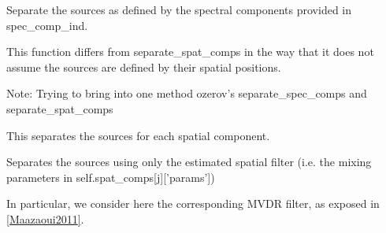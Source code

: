 \documentclass[letterpaper,10pt,english]{sphinxmanual}
\begin{document}
\begin{fulllineitems}

\begin{fulllineitems}
\label{reference/audiomodel:pyfasst.audioModel.FASST.separate_comps}
Separate the sources as defined by the spectral
components provided in spec\_comp\_ind.

This function differs from separate\_spat\_comps in the way
that it does not assume the sources are defined by their spatial
positions.

Note: Trying to bring into one method
ozerov's separate\_spec\_comps and separate\_spat\_comps

\end{fulllineitems}


\begin{fulllineitems}
\label{reference/audiomodel:pyfasst.audioModel.FASST.separate_spat_comps}
This separates the sources for each spatial component.

\end{fulllineitems}


\begin{fulllineitems}
\label{reference/audiomodel:pyfasst.audioModel.FASST.separate_spatial_filter_comp}
Separates the sources using only the estimated spatial
filter (i.e. the mixing parameters in self.spat\_comps{[}j{]}{[}'params'{]})

In particular, we consider here the corresponding MVDR filter,
as exposed in {\hyperref[reference/audiomodel:maazaoui2011]{{[}Maazaoui2011{]}}}.


\end{fulllineitems}
\end{fulllineitems}
\end{document}
